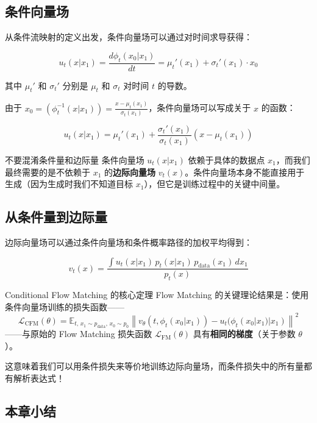 \documentclass[a4paper]{article}
\begin{document}
\subsection{条件向量场}

从条件流映射的定义出发，条件向量场可以通过对时间求导获得：

$$u_t(x | x_1) = \frac{d\phi_t(x_0 | x_1)}{dt} = \mu_t'(x_1) + \sigma_t'(x_1) \cdot x_0$$

其中 $\mu_t'$ 和 $\sigma_t'$ 分别是 $\mu_t$ 和 $\sigma_t$ 对时间 $t$ 的导数。

由于 $x_0 = (\phi_t^{-1}(x | x_1)) = \frac{x - \mu_t(x_1)}{\sigma_t(x_1)}$，条件向量场可以写成关于 $x$ 的函数：

$$u_t(x | x_1) = \mu_t'(x_1) + \frac{\sigma_t'(x_1)}{\sigma_t(x_1)} \left( x - \mu_t(x_1) \right)$$

\begin{warningbox}{不要混淆条件量和边际量}
条件向量场 $u_t(x | x_1)$ 依赖于具体的数据点 $x_1$，而我们最终需要的是不依赖于 $x_1$ 的\textbf{边际向量场} $v_t(x)$。条件向量场本身不能直接用于生成（因为生成时我们不知道目标 $x_1$），但它是训练过程中的关键中间量。
\end{warningbox}

\subsection{从条件量到边际量}

边际向量场可以通过条件向量场和条件概率路径的加权平均得到：

$$v_t(x) = \frac{\int u_t(x | x_1) \, p_t(x | x_1) \, p_{\text{data}}(x_1) \, dx_1}{p_t(x)}$$

\begin{importantbox}{Conditional Flow Matching 的核心定理}
Flow Matching 的关键理论结果是：使用条件向量场训练的损失函数——
$$\mathcal{L}_{\text{CFM}}(\theta) = \mathbb{E}_{t, \, x_1 \sim p_{\text{data}}, \, x_0 \sim p_0} \left\| v_\theta(t, \phi_t(x_0 | x_1)) - u_t(\phi_t(x_0 | x_1) | x_1) \right\|^2$$
——与原始的 Flow Matching 损失函数 $\mathcal{L}_{\text{FM}}(\theta)$ 具有\textbf{相同的梯度}（关于参数 $\theta$）。

这意味着我们可以用条件损失来等价地训练边际向量场，而条件损失中的所有量都有解析表达式！
\end{importantbox}

\subsection{本章小结}
\end{document}
